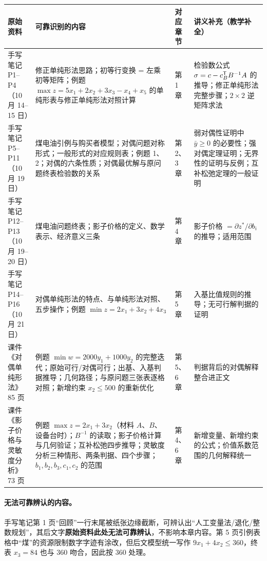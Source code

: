 {\small
\begin{xltabular}{\linewidth}{@{}>{\raggedright\arraybackslash}p{2.2cm}>{\raggedright\arraybackslash}X>{\raggedright\arraybackslash}p{1.5cm}>{\raggedright\arraybackslash}X@{}}
\toprule
{}\textbf{原始资料} & \textbf{可靠识别的内容} & \textbf{对应章节} & \textbf{讲义补充（教学补全）}\\
\midrule
手写笔记 P1--P4（10 月 14--15 日） & 修正单纯形法思路；初等行变换 = 左乘初等矩阵；例题 $\max z=5x_1+2x_2+3x_3-x_4+x_5$ 的单纯形表与修正单纯形法对照计算 & 第 1 章 & 检验数公式 $\sigma=c-c_B^{\mathsf T} B^{-1}A$ 的推导；修正单纯形法完整步骤；$2\times2$ 逆矩阵求法\\
\addlinespace
手写笔记 P5--P11（10 月 19 日） & 煤电油引例与购买者模型；对偶问题对称形式；一般形式的对应规则表；例题 1、2；对偶的六条性质；对偶最优解与原问题终表检验数的关系 & 第 2、3 章 & 弱对偶性证明中 $\bar y\ge0$ 的必要性；强对偶定理证明；无界性的证明与反例；互补松弛定理的一般证明\\
\addlinespace
手写笔记 P12--P13（10 月 19--20 日） & 煤电油问题终表；影子价格的定义、数学表示、经济意义三条 & 第 4 章 & 影子价格 $=\partial z^*/\partial b_i$ 的推导；适用范围\\
\addlinespace
手写笔记 P14--P16（10 月 21 日） & 对偶单纯形法的特点、与单纯形法对照、五步操作；例题 $\min z=2x_1+3x_2+4x_3$ & 第 5 章 & 入基比值规则的推导；无可行解判据的证明\\
\addlinespace
课件《对偶单纯形法》85 页 & 例题 $\min w=2000y_1+1000y_2$ 的完整迭代；原始可行/对偶可行；出基、入基判据推导；几何路径；与原问题三张表逐格对照；新增约束 $x_2\le500$ 的重新优化 & 第 5、6 章 & 判据背后的对偶解释整合进正文\\
\addlinespace
课件《影子价格与灵敏度分析》73 页 & 例题 $\max z=2x_1+3x_2$（材料 $A$、$B$、设备台时）；$B^{-1}$ 的读取；影子价格计算与几何验证；互补松弛四步推导；灵敏度分析三种情形、两条判据、四个步骤；$b_1,b_2,b_3,c_1,c_2$ 的范围 & 第 4、6 章 & 新增变量、新增约束的公式；价值系数范围的几何解释统一\\
\bottomrule
\end{xltabular}}


\paragraph{无法可靠辨认的内容。}手写笔记第 1 页“回顾”一行末尾被纸张边缘截断，可辨认出“人工变量法/退化/整数规划”，其后文字\textbf{原始资料此处无法可靠辨认}，不影响本章内容。第 5 页引例表格中“煤”的资源限制数字字迹有涂改，但后文模型统一写作 $9x_1+4x_2\le360$，终表 $x_3=84$ 也与 360 吻合，因此按 360 处理。

